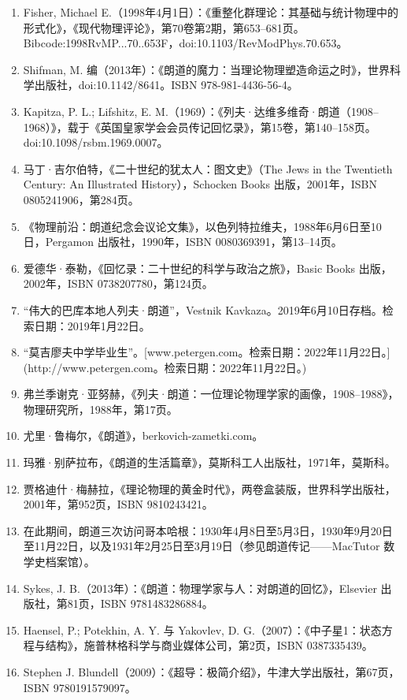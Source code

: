\begin{enumerate}
\item Fisher, Michael E.（1998年4月1日）：《重整化群理论：其基础与统计物理中的形式化》，《现代物理评论》，第70卷第2期，第653–681页。Bibcode:1998RvMP...70..653F，doi:10.1103/RevModPhys.70.653。
\item Shifman, M. 编（2013年）：《朗道的魔力：当理论物理塑造命运之时》，世界科学出版社，doi:10.1142/8641。ISBN 978-981-4436-56-4。
\item Kapitza, P. L.; Lifshitz, E. M.（1969）：《列夫·达维多维奇·朗道（1908–1968）》，载于《英国皇家学会会员传记回忆录》，第15卷，第140–158页。doi:10.1098/rsbm.1969.0007。
\item 马丁·吉尔伯特，《二十世纪的犹太人：图文史》（The Jews in the Twentieth Century: An Illustrated History），Schocken Books 出版，2001年，ISBN 0805241906，第284页。
\item 《物理前沿：朗道纪念会议论文集》，以色列特拉维夫，1988年6月6日至10日，Pergamon 出版社，1990年，ISBN 0080369391，第13–14页。
\item 爱德华·泰勒，《回忆录：二十世纪的科学与政治之旅》，Basic Books 出版，2002年，ISBN 0738207780，第124页。
\item “伟大的巴库本地人列夫·朗道”，Vestnik Kavkaza。2019年6月10日存档。检索日期：2019年1月22日。
\item “莫吉廖夫中学毕业生”。[www.petergen.com。检索日期：2022年11月22日。](http://www.petergen.com。检索日期：2022年11月22日。)
\item 弗兰季谢克·亚努赫，《列夫·朗道：一位理论物理学家的画像，1908–1988》，物理研究所，1988年，第17页。
\item 尤里·鲁梅尔，《朗道》，berkovich-zametki.com。
\item 玛雅·别萨拉布，《朗道的生活篇章》，莫斯科工人出版社，1971年，莫斯科。
\item 贾格迪什·梅赫拉，《理论物理的黄金时代》，两卷盒装版，世界科学出版社，2001年，第952页，ISBN 9810243421。
\item 在此期间，朗道三次访问哥本哈根：1930年4月8日至5月3日，1930年9月20日至11月22日，以及1931年2月25日至3月19日（参见朗道传记——MacTutor 数学史档案馆）。
\item Sykes, J. B.（2013年）：《朗道：物理学家与人：对朗道的回忆》，Elsevier 出版社，第81页，ISBN 9781483286884。
\item Haensel, P.; Potekhin, A. Y. 与 Yakovlev, D. G.（2007）：《中子星1：状态方程与结构》，施普林格科学与商业媒体公司，第2页，ISBN 0387335439。
\item Stephen J. Blundell（2009）：《超导：极简介绍》，牛津大学出版社，第67页，ISBN 9780191579097。

\end{enumerate}
